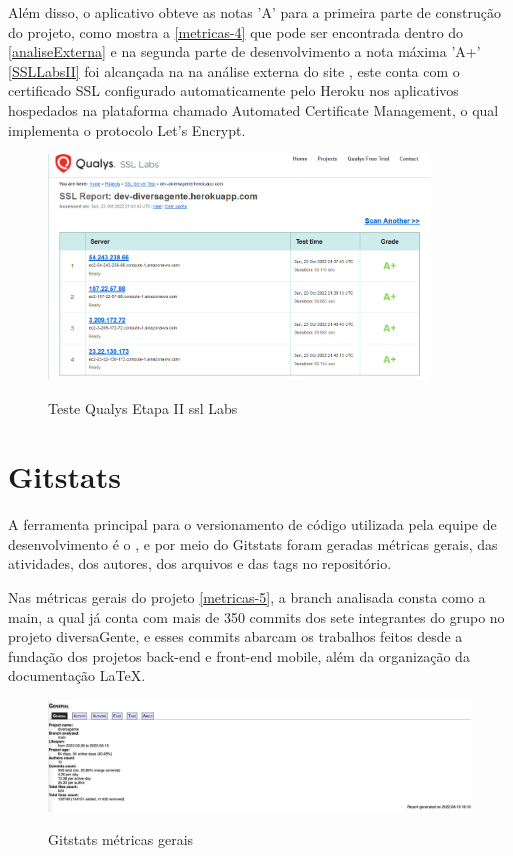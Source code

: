 Além disso, o aplicativo obteve as notas 'A' para a primeira parte de construção do projeto, como mostra a \autoref{metricas-4} que pode ser encontrada dentro do \autoref{analiseExterna} e na segunda parte de desenvolvimento a nota máxima 'A+' \autoref{SSLLabsII} foi alcançada na   na análise externa do site , este conta com o certificado SSL configurado automaticamente pelo Heroku nos aplicativos hospedados na plataforma chamado Automated Certificate Management, o qual implementa o protocolo Let’s Encrypt.

\begin{figure}[h]
	\centering
	\caption{\label{fig_arq_virado}Teste Qualys Etapa II \ac{ssl} Labs}
	\includegraphics[width=0.90\textwidth]{anexos/SSLlabsII.png}
	\label{SSLLabsII}
\end{figure}

\pagebreak

\section{Gitstats}

A ferramenta principal para o versionamento de código utilizada pela equipe de desenvolvimento é o , e por meio do Gitstats foram geradas métricas gerais, das atividades, dos autores, dos arquivos e das tags no repositório. 

Nas métricas gerais do projeto \autoref{metricas-5}, a branch analisada consta como a main, a qual já conta com mais de 350 commits dos sete integrantes do grupo no projeto diversaGente, e esses commits abarcam os trabalhos feitos desde a fundação dos projetos back-end e front-end mobile, além da organização da documentação LaTeX. 

\begin{figure}[htb]
	\centering
	\caption{\label{fig_arq_virado}Gitstats métricas gerais}
	\includegraphics[width=1.00\textwidth]{anexos/metricas5.png}
	\label{metricas-5}
\end{figure}

